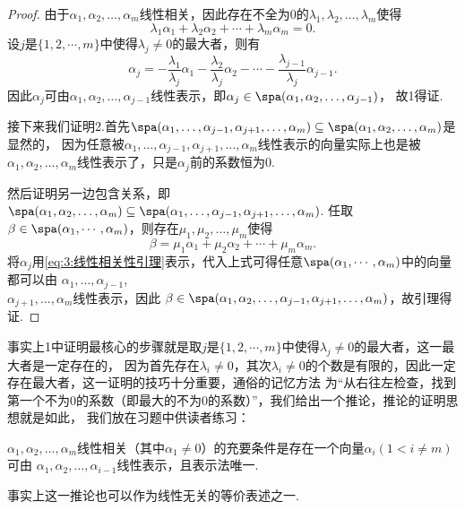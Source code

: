\begin{proof}
    由于$\alpha_1,\alpha_2,\ldots,\alpha_m$线性相关，因此存在不全为0的$\lambda_1,\lambda_2,\ldots,\lambda_m$使得
    \[\lambda_1\alpha_1+\lambda_2\alpha_2+\cdots+\lambda_m\alpha_m=0.\]
    设$j$是$\{1,2,\cdots,m\}$中使得$\lambda_j\neq 0$的最大者，则有
    \begin{equation}\label{eq:3:线性相关性引理}
        \alpha_j=-\frac{\lambda_1}{\lambda_j}\alpha_1-\frac{\lambda_2}{\lambda_j}\alpha_2-\cdots-\frac{\lambda_{j-1}}{\lambda_j}\alpha_{j-1}.
    \end{equation}
    因此$\alpha_j$可由$\alpha_1,\alpha_2,\ldots,\alpha_{j-1}$线性表示，即$\alpha_j\in\spa(\alpha_1,\alpha_2,\ldots,\alpha_{j-1})$，
    故1得证.

    接下来我们证明2.首先$\spa(\alpha_1,\ldots,\alpha_{j-1},\alpha_{j+1},\ldots,\alpha_m)\subseteq\spa(\alpha_1,\alpha_2,\ldots,\alpha_m)$是显然的，
    因为任意被$\alpha_1,\ldots,\alpha_{j-1},\alpha_{j+1},\ldots,\alpha_m$线性表示的向量实际上也是被
    $\alpha_1,\alpha_2,\ldots,\alpha_m$线性表示了，只是$\alpha_j$前的系数恒为0.

    然后证明另一边包含关系，即$\spa(\alpha_1,\alpha_2,\ldots,\alpha_m)\subseteq\spa(\alpha_1,\ldots,\alpha_{j-1},\alpha_{j+1},\ldots,\alpha_m)$.
    任取$\beta\in\spa(\alpha_1,\cdots,\alpha_m)$，则存在$\mu_1,\mu_2,\ldots,\mu_m$使得
    \[\beta=\mu_1\alpha_1+\mu_2\alpha_2+\cdots+\mu_m\alpha_m.\]
    将$\alpha_j$用\autoref{eq:3:线性相关性引理}表示，代入上式可得任意$\spa(\alpha_1,\cdots,\alpha_m)$中的向量都可以由
    $\alpha_1,\ldots,\alpha_{j-1}$,\\$\alpha_{j+1},\ldots,\alpha_m$线性表示，因此
    $\beta\in\spa(\alpha_1,\alpha_2,\ldots,\alpha_{j-1},\alpha_{j+1},\ldots,\alpha_m)$，故引理得证.
\end{proof}

事实上1中证明最核心的步骤就是取$j$是$\{1,2,\cdots,m\}$中使得$\lambda_j\neq 0$的最大者，这一最大者是一定存在的，
因为首先存在$\lambda_i\neq 0$，其次$\lambda_i\neq 0$的个数是有限的，因此一定存在最大者，这一证明的技巧十分重要，通俗的记忆方法
为``从右往左检查，找到第一个不为0的系数（即最大的不为0的系数）''，我们给出一个推论，推论的证明思想就是如此，
我们放在习题中供读者练习：
\begin{corollary}
    $\alpha_1,\alpha_2,\ldots,\alpha_m$线性相关（其中$\alpha_1\neq 0$）的充要条件是存在一个向量$\alpha_i(1<i\neq m)$可由
    $\alpha_1,\alpha_2,\ldots,\alpha_{i-1}$线性表示，且表示法唯一.
\end{corollary}
事实上这一推论也可以作为线性无关的等价表述之一.

